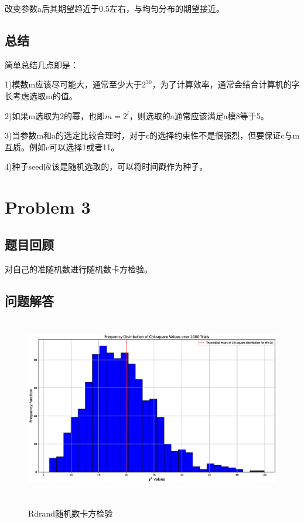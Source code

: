 \documentclass[12pt,a4paper]{article}%
\begin{document}
    改变参数a后其期望趋近于0.5左右，与均匀分布的期望接近。


    \subsection{总结}

    简单总结几点即是：

    1)模数m应该尽可能大，通常至少大于$2^{30}$，为了计算效率，通常会结合计算机的字长考虑选取m的值。

    2)如果m选取为2的幂，也即$m=2^l$，则选取的a通常应该满足a模8等于5。

    3)当参数m和a的选定比较合理时，对于c的选择约束性不是很强烈，但要保证c与m互质。例如c可以选择1或者11。

    4)种子seed应该是随机选取的，可以将时间戳作为种子。

    \section{Problem 3}
    \subsection{题目回顾}
    对自己的准随机数进行随机数卡方检验。
    \subsection{问题解答}
    \begin{figure}[htbp]
        \centering
        \includegraphics[height=8cm]{Rdrand.eps}\label{fig:figure4}
        \caption{Rdrand随机数卡方检验}
    \end{figure}
\end{document}
